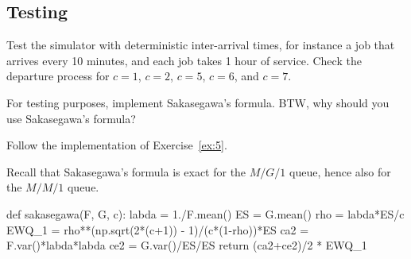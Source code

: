 \subsection{Testing}
\label{sec:testing-1}

\begin{exercise}
Test the simulator with deterministic inter-arrival times, for instance a job that arrives every 10 minutes, and each job takes 1 hour of service. Check the departure process for $c=1$, $c=2$, $c=5$, $c=6$, and $c=7$. 
\end{exercise}

\begin{exercise}
  For testing purposes, implement Sakasegawa's formula.  BTW, why should you use Sakasegawa's formula?

\begin{hint}
Follow the implementation of Exercise~\ref{ex:5}. 

  \end{hint}

  \begin{solution}
Recall that Sakasegawa's formula is exact for the $M/G/1$ queue, hence also for the $M/M/1$ queue. 

\begin{pyblock}

def sakasegawa(F, G, c):
    labda = 1./F.mean()
    ES = G.mean()
    rho = labda*ES/c
    EWQ_1 = rho**(np.sqrt(2*(c+1)) - 1)/(c*(1-rho))*ES
    ca2 = F.var()*labda*labda
    ce2 = G.var()/ES/ES
    return (ca2+ce2)/2 * EWQ_1
    
  \end{pyblock}
    
    
  \end{solution}
\end{exercise}


